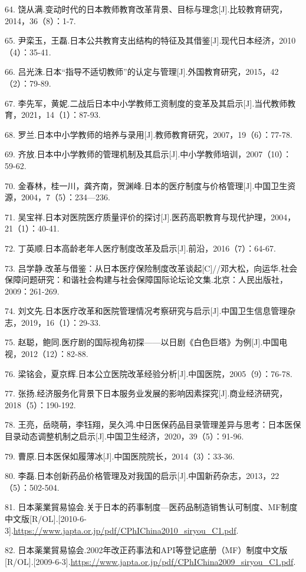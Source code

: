 64. 饶从满.变动时代的日本教师教育改革背景、目标与理念[J].比较教育研究，2014，36（8）：1-7.

65. 尹栾玉，王磊.日本公共教育支出结构的特征及其借鉴[J].现代日本经济，2010（4）：35-41.

66. 吕光洙.日本“指导不适切教师”的认定与管理[J].外国教育研究，2015，42（2）：79-89.

67. 李先军，黄妮.二战后日本中小学教师工资制度的变革及其启示[J].当代教师教育，2021，14（1）：87-93.

68. 罗兰.日本中小学教师的培养与录用[J].教师教育研究，2007，19（6）：77-78.

69. 齐放.日本中小学教师的管理机制及其启示[J].中小学教师培训，2007（10）：59-62.

70. 金春林，桂一川，龚齐南，贺渊峰.日本的医疗制度与价格管理[J].中国卫生资源，2004，7（5）：234—236.

71. 吴宝祥.日本对医院医疗质量评价的探讨[J].医药高职教育与现代护理，2004，21（1）：40-41.

72. 丁英顺.日本高龄老年人医疗制度改革及启示[J].前沿，2016（7）：64-67.

73. 吕学静.改革与借鉴：从日本医疗保险制度改革谈起[C]//邓大松，向运华.社会保障问题研究：和谐社会构建与社会保障国际论坛论文集.北京：人民出版社，2009：261-269.

74. 刘文先.日本医疗改革和医院管理情况考察研究与启示[J].中国卫生信息管理杂志，2019，16（1）：29-33.

75. 赵聪，鲍同.医疗剧的国际视角初探——以日剧《白色巨塔》为例[J].中国电视，2012（12）：82-88.

76. 梁铭会，夏京辉.日本公立医院改革经验分析[J].中国医院，2005（9）：76-78.

77. 张扬.经济服务化背景下日本服务业发展的影响因素探究[J].商业经济研究，2018（5）：190-192.

78. 王亮，岳晓萌，李钰翔，吴久鸿.中日医保药品目录管理差异与思考：日本医保目录动态调整机制之启示[J].中国卫生经济，2020，39（5）：91-96.

79. 曹原.日本医保如履薄冰[J].中国医院院长，2014（3）：33-36.

80. 李磊.日本创新药品价格管理及对我国的启示[J].中国新药杂志，2013，22（5）：502-504.

81. 日本薬業貿易協会.关于日本的药事制度—医药品制造销售认可制度、MF制度中文版[R/OL].\allowbreak{}[2010-6-3].\url{https://www.japta.or.jp/pdf/CPhIChina2010_siryou_C1.pdf}.

82. 日本薬業貿易協会.2002年改正药事法和API等登记底册（MF）制度中文版[R/OL].\allowbreak{}[2009-6-3].\url{https://www.japta.or.jp/pdf/CPhIChina2009_siryou_C1.pdf}.

